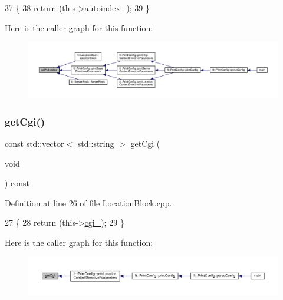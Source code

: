 \begin{DoxyCode}
37     \{
38         \textcolor{keywordflow}{return} (this->\hyperlink{classft_1_1_base_directives_a4ebffbe32f50a462afa139c6f03c1a4f}{autoindex\_});
39     \}
\end{DoxyCode}
Here is the caller graph for this function\+:
\nopagebreak
\begin{figure}[H]
\begin{center}
\leavevmode
\includegraphics[width=350pt]{classft_1_1_base_directives_a4c11ed7ad76aeac228b029a2444de568_icgraph}
\end{center}
\end{figure}
\mbox{\label{classft_1_1_location_block_adc8c829b27e09893233983eb1c727755}} 
\subsubsection{\texorpdfstring{get\+Cgi()}{getCgi()}}
{\footnotesize\ttfamily const std\+::vector$<$ std\+::string $>$ get\+Cgi (\begin{DoxyParamCaption}\item[{void}]{ }\end{DoxyParamCaption}) const}



Definition at line 26 of file Location\+Block.\+cpp.


\begin{DoxyCode}
27     \{
28         \textcolor{keywordflow}{return} (this->\hyperlink{classft_1_1_location_block_a1952859864bec449ee1a20b4e90f829a}{cgi\_});
29     \}
\end{DoxyCode}
Here is the caller graph for this function\+:
\nopagebreak
\begin{figure}[H]
\begin{center}
\leavevmode
\includegraphics[width=350pt]{classft_1_1_location_block_adc8c829b27e09893233983eb1c727755_icgraph}
\end{center}
\end{figure}
\mbox{\label{classft_1_1_location_block_a9f90dac2d6314b77ccb9c9d4ab2a3fa4}} 
